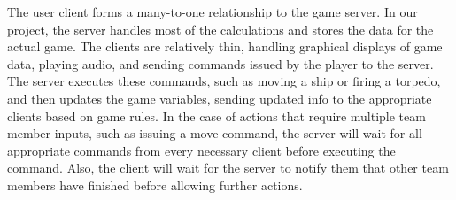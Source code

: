 The user client forms a many-to-one relationship to the game server. In our project, the server handles most of the calculations and stores the data for the actual game. The clients are relatively thin, handling graphical displays of game data, playing audio, and sending commands issued by the player to the server. The server executes these commands, such as moving a ship or firing a torpedo, and then updates the game variables, sending updated info to the appropriate clients based on game rules. In the case of  actions that require multiple team member inputs, such as issuing a move command, the server will wait for all appropriate commands from every necessary client before executing the command. Also, the client will wait for the server to notify them that other team members have finished before allowing further actions.

